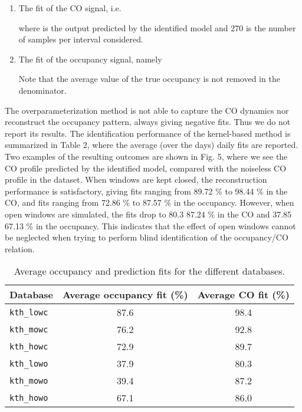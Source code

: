 \documentclass{article}
\begin{document}
\begin{enumerate}
\item The fit of the CO signal, i.e.

where  is the output predicted by the identified model and 270 is the number of samples per interval considered.
\item The fit of the occupancy signal, namely

Note that the average value of the true occupancy is not removed in the denominator.
\end{enumerate}
The overparameterization method is not able to capture the CO dynamics nor reconstruct the occupancy pattern, always giving negative fits. Thus we do not report its results.
The identification performance of the kernel-based method is summarized in
Table 2, where the average (over the days) daily fits are reported. Two
examples of the resulting outcomes are shown in Fig. 5, where we see the
CO profile predicted by the identified model, compared with the noiseless
CO profile in the dataset.
When windows are kept closed, the reconstruction performance is satisfactory, giving fits ranging from 89.72 \% to 98.44 \% in the CO, and fits ranging from 72.86 \% to 87.57 \% in the occupancy. However, when open windows are simulated, the fits drop to 80.3   87.24 \% in the CO and 37.85   67.13 \% in the occupancy. This indicates that the effect of open windows cannot be neglected when trying to perform blind identification of the occupancy/CO relation.
\begin{table}[h!]\label{tab:fits}
\begin{center}
\begin{tabular}{lcc}
  \toprule
Database & Average occupancy fit (\%)& Average CO fit (\%) \\
\midrule
\texttt{kth\_lowc} & 87.6 & 98.4 \\
\texttt{kth\_mowc} & 76.2 & 92.8 \\
\texttt{kth\_howc} & 72.9 & 89.7 \\
\texttt{kth\_lowo} & 37.9 & 80.3 \\
\texttt{kth\_mowo} & 39.4 & 87.2 \\
\texttt{kth\_howo} & 67.1 & 86.0 \\
\bottomrule
\end{tabular}
\vspace{2mm}
\caption{Average occupancy and prediction fits for the different databases.}
\end{center}
\end{table}
\end{document}
